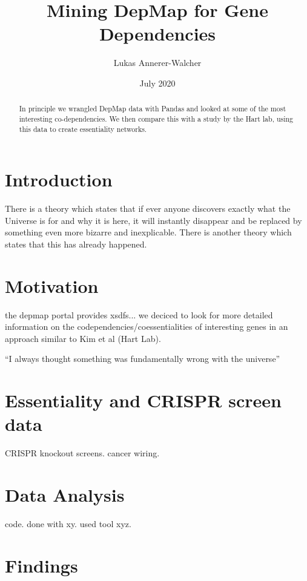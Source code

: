 \documentclass{article}
\title{Mining DepMap for Gene Dependencies}
\author{Lukas Annerer-Walcher}
\date{July 2020}
\begin{document}
\maketitle

\begin{abstract}
    In principle we wrangled DepMap data with Pandas and looked at some of the most interesting co-dependencies.
    We then compare this with a study by the Hart lab, using this data to create essentiality networks.
\end{abstract}


\section{Introduction}
There is a theory which states that if ever anyone discovers exactly what the Universe is for and why it is here, it will instantly disappear and be replaced by something even more bizarre and inexplicable.
There is another theory which states that this has already happened.


\section{Motivation}

the depmap portal provides xsdfs...
we deciced to look for more detailed information
on the codependencies/coessentialities of interesting
genes in an approach similar to Kim et al (Hart Lab).


``I always thought something was fundamentally wrong with the universe'' \citep{adams1995hitchhiker}


\section{Essentiality and CRISPR screen data}
CRISPR knockout screens. cancer wiring. 


\section{Data Analysis}
code.
done with xy.
used tool xyz.

\section{Findings}





\end{document}
